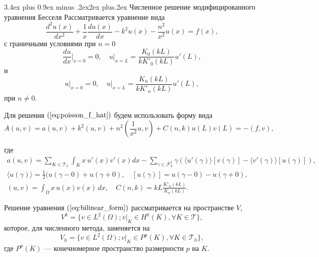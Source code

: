 \documentclass[a4paper,12pt, russian, titlepage]{article} %
\makeatletter
\numberwithin{equation}{section}
\renewcommand{\section}{\@startsection{section}{1}{1cm}%
{3.4ex plus 0.9ex minus .2ex}{2ex plus.2ex}%
{\normalfont\large\bfseries}}
\numberwithin{theorem}{subsection}
\numberwithin{definition}{subsection}
\numberwithin{proposition}{subsection}
\makeatother
\begin{document}
\section{Численное решение модифицированного уравнения Бесселя}
Рассматривается уравнение вида
\begin{equation}\label{eq:poisson_f_hat}
\frac{d^2 u(x)}{dx^2} + \frac{1}{x}\frac{d u(x)}{d x} - k^2 u(x) - \frac{n^2}{x^2} u(x) = f(x),
\end{equation} 
с граничными условиями при $n = 0$
\begin{equation}\label{eq:better_poisson_f_hat_cond_1}
 \frac{du}{dx}\bigg|_{x = 0} = 0, \quad u \big|_{x = L} = \frac{K_0(k L)}{k K'_0(k L)} u'(L),
\end{equation}
и
\begin{equation}\label{eq:better_poisson_f_hat_cond_2}
u\big|_{x = 0} = 0, \quad u \big|_{x = L} = \frac{K_n(k L)}{k K'_n(k L)} u'(L),
\end{equation}
при $n \ne 0$. \par

Для решения $(\ref{eq:poisson_f_hat})$ будем использовать форму вида 
\begin{equation}\label{eq:bilinear_form}
A(u, v) = a(u, v)  + k^2 (u, v)  +  n^2  \left(\frac{1}{x^2} u, v \right) + C(n, k) u(L) v(L) = -\left(f, v \right),
\end{equation}

где
\begin{gather}
a(u, v) = \sum_{K \in \mathcal{T}_h} \int_K x \, u'(x) v'(x) dx - \sum_{\gamma \in \mathcal{F}^I_h}\gamma \left(  \langle  u'(\gamma) \rangle [ v(\gamma) ] -  \langle  v'(\gamma) \rangle [ u(\gamma) ] \right), \\
\langle u(\gamma) \rangle = \frac{1}{2} (u(\gamma - 0) + u(\gamma + 0), \quad [u(\gamma)] = u(\gamma - 0) - u(\gamma + 0), \\
(u, v) = \int_\Omega x \, u(x) v(x) \, dx, \quad C(n, k) = k L \frac{K'_{n}(k L)}{K_n(k L)}.
\end{gather} \par
Решение уравнения $(\ref{eq:bilinear_form})$ рассматривается на пространстве $V$, 
\begin{equation}
V^k = \{v \in L^2(\Omega); v|_K \in H^k(K)  ,\forall K \in \mathcal{T} \},
\end{equation}
которое, для численного метода, заменяется на 
\begin{equation}
V_h = \{v \in L^2(\Omega); v|_K \in P^p(K)  ,\forall K \in \mathcal{T}_h \},
\end{equation}
где $P^p(K)$ --- конечномерное пространство размерности $p$ на $K$.
\end{document}
